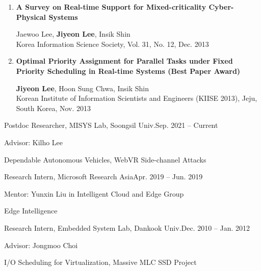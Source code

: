 \documentclass[11pt,letterpaper]{article}
\begin{document}
\begin{enumerate}
	\item \textbf{A Survey on Real-time Support for Mixed-criticality Cyber-Physical Systems} \\
	\begin{small}
		Jaewoo Lee, \textbf{Jiyeon Lee}, Insik Shin\\ 
		Korea Information Science Society, Vol. 31, No. 12, Dec. 2013
	\end{small}
	
	\item \textbf{Optimal Priority Assignment for Parallel Tasks under Fixed Priority Scheduling in Real-time Systems (Best Paper Award)} \\
	\begin{small}
		\textbf{Jiyeon Lee}, Hoon Sung Chwa, Insik Shin\\ 
		Korean Institute of Information Scientists and Engineers (KIISE 2013), Jeju, South Korea, Nov. 2013
	\end{small}
\end{enumerate}

%
%

\begin{envtime}{Postdoc Researcher, MISYS Lab, Soongsil Univ.}{Sep. 2021 -- Current}
	\item Advisor: Kilho Lee
	\item Dependable Autonomous Vehicles, WebVR Side-channel Attacks
\end{envtime}
\begin{envtime}[China]{Research Intern, Microsoft Research Asia}{Apr. 2019 -- Jun. 2019}
	\item Mentor:  Yunxin Liu in Intelligent Cloud and Edge Group
	\item Edge Intelligence
\end{envtime}
\begin{envtime}{Research Intern, Embedded System Lab, Dankook Univ.}{Dec. 2010 -- Jan. 2012}
	\item Advisor: Jongmoo Choi
	\item I/O Scheduling for Virtualization, Massive MLC SSD Project
\end{envtime}
\end{document}
